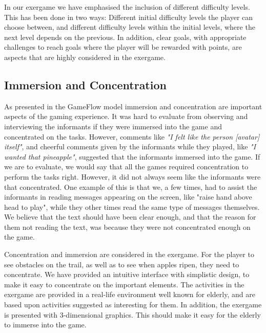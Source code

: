 In our exergame we have emphasised the inclusion of different difficulty levels. This has been done in two ways: Different initial difficulty levels the player can choose between, and different difficulty levels within the initial levels, where the next level depends on the previous. In addition, clear goals, with appropriate challenges to reach goals where the player will be rewarded with points, are aspects that are highly considered in the exergame.  
 
\subsection{Immersion and Concentration}
As presented in the GameFlow model \cite{sweetser} immersion and concentration are important aspects of the gaming experience. It was hard to evaluate from observing and interviewing the informants if they were immersed into the game and concentrated on the tasks. However, comments like \emph{"I felt like the person [avatar] itself"}, and cheerful comments given by the informants while they played, like \emph{"I wanted that pineapple"}, suggested that the informants immersed into the game. If we are to evaluate, we would say that all the games required concentration to perform the tasks right. However, it did not always seem like the informants were that concentrated. One example of this is that we, a few times, had to assist the informants in reading messages appearing on the screen, like "raise hand above head to play", while they other times read the same type of messages themselves. We believe that the text should have been clear enough, and that the reason for them not reading the text, was because they were not concentrated enough on the game. 

Concentration and immersion are considered in the exergame. For the player to see obstacles on the trail, as well as to see when apples ripen, they need to concentrate. We have provided an intuitive interface with simplistic design, to make it easy to concentrate on the important elements. The activities in the exergame are provided in a real-life environment well known for elderly, and are based upon activities suggested as interesting for them. In addition, the exergame is presented with 3-dimensional graphics. This should make it easy for the elderly to immerse into the game.

